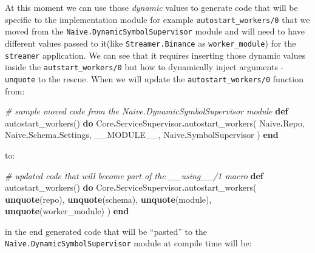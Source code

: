 \documentclass[
  oneside]{book}
\newenvironment{Shaded}{\begin{snugshade}}{\end{snugshade}}
\newcommand{\CommentTok}[1]{\textcolor[rgb]{0.56,0.35,0.01}{\textit{#1}}}
\newcommand{\ConstantTok}[1]{\textcolor[rgb]{0.00,0.00,0.00}{#1}}
\newcommand{\KeywordTok}[1]{\textcolor[rgb]{0.13,0.29,0.53}{\textbf{#1}}}
\newcommand{\NormalTok}[1]{#1}
\newcommand{\OperatorTok}[1]{\textcolor[rgb]{0.81,0.36,0.00}{\textbf{#1}}}
\begin{document}
At this moment we can use those \emph{dynamic} values to generate code that will be specific to the implementation module for example \texttt{autostart\_workers/0} that we moved from the \texttt{Naive.DynamicSymbolSupervisor} module and will need to have different values passed to it(like \texttt{Streamer.Binance} as \texttt{worker\_module}) for the \texttt{streamer} application. We can see that it requires inserting those dynamic values inside the \texttt{autstart\_workers/0} but how to dynamically inject arguments - \texttt{unquote} to the rescue. When we will update the \texttt{autostart\_workers/0} function from:

\begin{Shaded}
\begin{Highlighting}[]
      \CommentTok{\# sample moved code from the \textasciigrave{}Naive.DynamicSymbolSupervisor\textasciigrave{} module}
      \KeywordTok{def}\NormalTok{ autostart\_workers() }\KeywordTok{do}
          \ConstantTok{Core}\OperatorTok{.}\ConstantTok{ServiceSupervisor}\OperatorTok{.}\NormalTok{autostart\_workers(}
          \ConstantTok{Naive}\OperatorTok{.}\ConstantTok{Repo}\NormalTok{,}
          \ConstantTok{Naive}\OperatorTok{.}\ConstantTok{Schema}\OperatorTok{.}\ConstantTok{Settings}\NormalTok{,}
          \ConstantTok{\_\_MODULE\_\_}\NormalTok{,}
          \ConstantTok{Naive}\OperatorTok{.}\ConstantTok{SymbolSupervisor}
\NormalTok{        )}
      \KeywordTok{end}
\end{Highlighting}
\end{Shaded}

to:

\begin{Shaded}
\begin{Highlighting}[]
      \CommentTok{\# updated code that will become part of the \textasciigrave{}\_\_using\_\_/1\textasciigrave{} macro}
      \KeywordTok{def}\NormalTok{ autostart\_workers() }\KeywordTok{do}
        \ConstantTok{Core}\OperatorTok{.}\ConstantTok{ServiceSupervisor}\OperatorTok{.}\NormalTok{autostart\_workers(}
          \KeywordTok{unquote}\NormalTok{(repo),}
          \KeywordTok{unquote}\NormalTok{(schema),}
          \KeywordTok{unquote}\NormalTok{(module),}
          \KeywordTok{unquote}\NormalTok{(worker\_module)}
\NormalTok{        )}
      \KeywordTok{end}
\end{Highlighting}
\end{Shaded}

in the end generated code that will be ``pasted'' to the \texttt{Naive.DynamicSymbolSupervisor} module at compile time will be:
\end{document}
